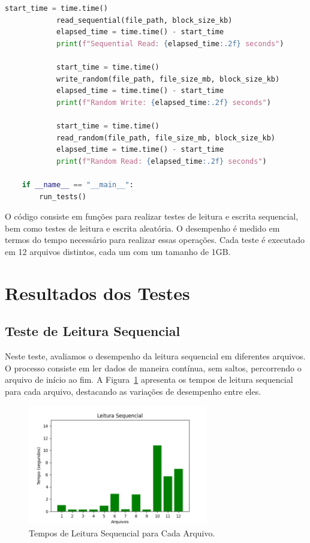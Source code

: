 \documentclass[
	12pt,				%
	openright,			%
	oneside,			%
	a4paper,			%
	chapter=TITLE,		%
	english,			%
	french,				%
	spanish,			%
	brazil				%
	]{abntex2}
\theoremstyle{definition}
\begin{document}
\begin{lstlisting}[language=Python, caption={Código de Benchmark}, label=benchmark_code]
			start_time = time.time()
			read_sequential(file_path, block_size_kb)
			elapsed_time = time.time() - start_time
			print(f"Sequential Read: {elapsed_time:.2f} seconds")
	
			start_time = time.time()
			write_random(file_path, file_size_mb, block_size_kb)
			elapsed_time = time.time() - start_time
			print(f"Random Write: {elapsed_time:.2f} seconds")
	
			start_time = time.time()
			read_random(file_path, file_size_mb, block_size_kb)
			elapsed_time = time.time() - start_time
			print(f"Random Read: {elapsed_time:.2f} seconds")
	
	if __name__ == "__main__":
		run_tests()
\end{lstlisting}


O código consiste em funções para realizar testes de leitura e escrita sequencial, 
bem como testes de leitura e escrita aleatória. O desempenho é medido em termos do 
tempo necessário para realizar essas operações. Cada teste é executado em 12 arquivos 
distintos, cada um com um tamanho de 1GB.

\section{Resultados dos Testes}

\subsection{Teste de Leitura Sequencial}

Neste teste, avaliamos o desempenho da leitura sequencial em diferentes arquivos. 
O processo consiste em ler dados de maneira contínua, sem saltos, percorrendo o 
arquivo de início ao fim. A Figura~\ref{fig:sr} apresenta os tempos de leitura 
sequencial para cada arquivo, destacando as variações de desempenho entre eles.

\begin{figure}[H]
    \centering
    \includegraphics[width=0.7\textwidth]{SeqRead.png}
    \caption{Tempos de Leitura Sequencial para Cada Arquivo.}
    \label{fig:sr}
\end{figure}
\end{document}
